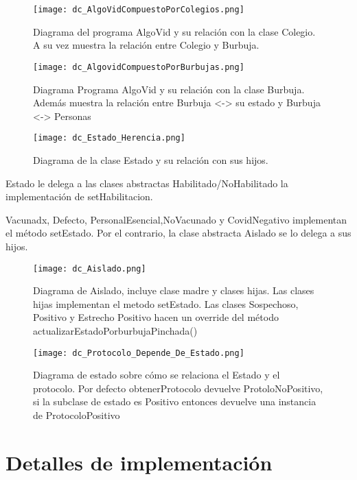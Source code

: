 \documentclass[titlepage,a4paper]{article}
\begin{document}
\begin{figure}[H]
\centering
\texttt{[image: dc\_AlgoVidCompuestoPorColegios.png]}
\caption{\label{fig:class02}Diagrama del programa AlgoVid y su relación con la clase Colegio. A su vez muestra la relación entre Colegio y Burbuja.}
\end{figure}

\begin{figure}[H]
\centering
\texttt{[image: dc\_AlgovidCompuestoPorBurbujas.png]}
\caption{\label{fig:class03}Diagrama Programa AlgoVid y su relación con la clase Burbuja. Además muestra la relación entre Burbuja <-> su estado y Burbuja <-> Personas}
\end{figure}

\begin{figure}[H]
\centering
\texttt{[image: dc\_Estado\_Herencia.png]}
\caption{\label{fig:class04}Diagrama de la clase Estado y su relación con sus hijos.
}
\end{figure}
Estado le delega a las clases abstractas Habilitado/NoHabilitado la implementación de setHabilitacion.\hfill

Vacunadx, Defecto, PersonalEsencial,NoVacunado y CovidNegativo implementan el método setEstado. Por el contrario, la clase abstracta Aislado se lo delega a sus hijos.

\begin{figure}[H]
\centering
\texttt{[image: dc\_Aislado.png]}
\caption{\label{fig:class05}Diagrama de Aislado, incluye clase madre y clases hijas. Las clases hijas implementan el metodo setEstado. Las clases Sospechoso, Positivo y Estrecho Positivo hacen un override del método actualizarEstadoPorburbujaPinchada()}
\end{figure}

\begin{figure}[H]
\centering
\texttt{[image: dc\_Protocolo\_Depende\_De\_Estado.png]}
\caption{\label{fig:class06}Diagrama de estado sobre cómo se relaciona el Estado y el protocolo. Por defecto obtenerProtocolo devuelve ProtoloNoPositivo, si la subclase de estado es Positivo entonces devuelve una instancia de ProtocoloPositivo}
\end{figure}

\section{Detalles de implementación}\label{sec:implementacion}
\end{document}
